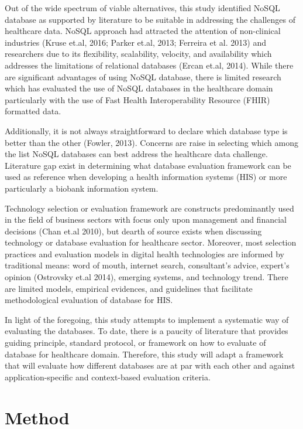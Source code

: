 \documentclass[review]{elsarticle}
\begin{document}
Out of the wide spectrum of viable alternatives, this study identified NoSQL database as supported by literature to be suitable in addressing the challenges of healthcare data. NoSQL approach had attracted the attention of non-clinical industries (Kruse et.al, 2016; Parker et.al, 2013; Ferreira et al. 2013) and researchers due to its flexibility, scalability, velocity, and availability which addresses the limitations of relational databases (Ercan et.al, 2014). While there are significant advantages of using NoSQL database, there is limited research which has evaluated the use of NoSQL databases in the healthcare domain particularly with the use of Fast Health Interoperability Resource (FHIR) formatted data. 

Additionally, it is not always straightforward to declare which database type is better than the other (Fowler, 2013). Concerns are raise in selecting which among the list NoSQL databases can best address the healthcare data challenge. Literature gap exist in determining what database evaluation framework can be used as reference when developing a health information systems (HIS) or more particularly a biobank information system.

Technology selection or evaluation framework are constructs predominantly used in the field of business sectors with focus only upon management and financial decisions (Chan et.al 2010), but dearth of source exists when discussing technology or database evaluation for healthcare sector. Moreover, most selection practices and evaluation models in digital health technologies are informed by traditional means: word of mouth, internet search, consultant’s advice, expert’s opinion (Ostrovsky et.al 2014), emerging systems, and technology trend. There are limited models, empirical evidences, and guidelines that facilitate methodological evaluation of database for HIS.

In light of the foregoing, this study attempts to implement a systematic way of evaluating the databases. To date, there is a paucity of literature that provides guiding principle, standard protocol, or framework on how to evaluate of database for healthcare domain.  Therefore, this study will adapt a framework that will evaluate how different databases are at par with each other and against application-specific and context-based evaluation criteria. 

\section{Method}
\end{document}
